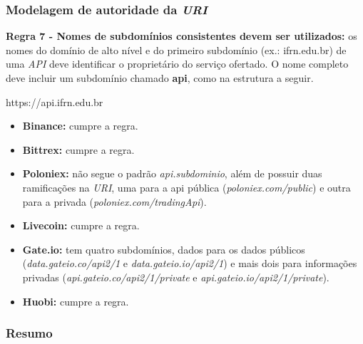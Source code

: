 \subsubsection{Modelagem de autoridade da \textit{URI}}

\textbf{Regra 7 - Nomes de subdomínios consistentes devem ser utilizados:} os nomes do domínio de alto nível e do primeiro subdomínio (ex.: ifrn.edu.br) de uma \textit{API} deve identificar o proprietário do serviço ofertado. O nome completo deve incluir um subdomínio chamado \textbf{api}, como na estrutura a seguir.

\centerline{https://api.ifrn.edu.br}

\begin{itemize}
    \item \textbf{Binance:} cumpre a regra.
    \item \textbf{Bittrex:} cumpre a regra.
    \item \textbf{Poloniex:} não segue o padrão \textit{api.subdominio}, além de possuir duas ramificações na \textit{URI}, uma para a api pública (\textit{poloniex.com/public}) e outra para a privada (\textit{poloniex.com/tradingApi}).
    \item \textbf{Livecoin:} cumpre a regra.
    \item \textbf{Gate.io:} tem quatro subdomínios, dados para os dados públicos (\textit{data.gateio.co/api2/1} e \textit{data.gateio.io/api2/1}) e mais dois para informações privadas (\textit{api.gateio.co/api2/1/private} e \textit{api.gateio.io/api2/1/private}).
    \item \textbf{Huobi:} cumpre a regra.
\end{itemize}

\subsubsection{Resumo}

